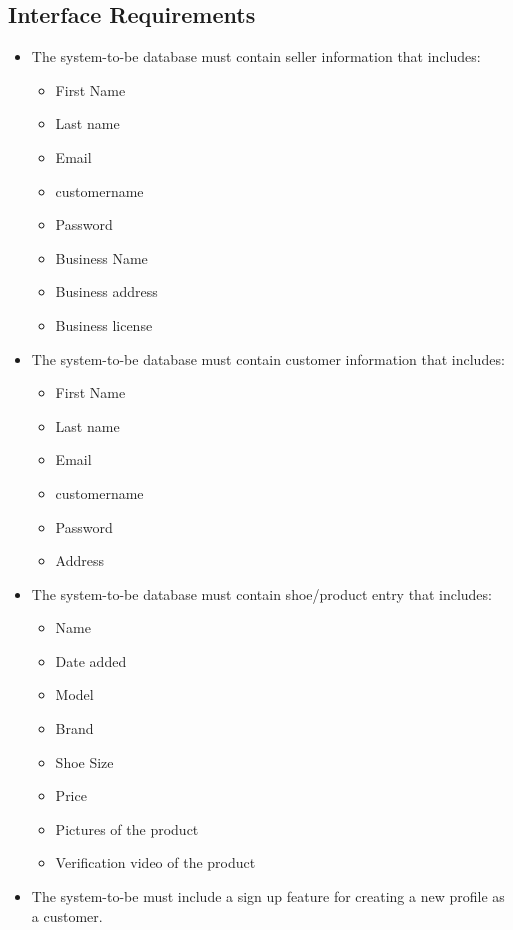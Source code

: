 \subsection{Interface Requirements}
\begin{itemize}
  \item The system-to-be database must contain seller information that includes:
        \begin{itemize}
          \item First Name
          \item Last name
          \item Email
          \item customername
          \item Password
          \item Business Name
          \item Business address
          \item Business license
        \end{itemize}
  \item The system-to-be database must contain customer information that includes:
        \begin{itemize}
          \item First Name
          \item Last name
          \item Email
          \item customername
          \item Password
          \item Address
        \end{itemize}
  \item The system-to-be database must contain shoe/product entry that includes:
        \begin{itemize}
          \item Name
          \item Date added
          \item Model
          \item Brand
          \item Shoe Size
          \item Price
          \item Pictures of the product
          \item Verification video of the product
        \end{itemize}
  \item The system-to-be must include a sign up feature for creating a new profile as a customer.

\end{itemize}
